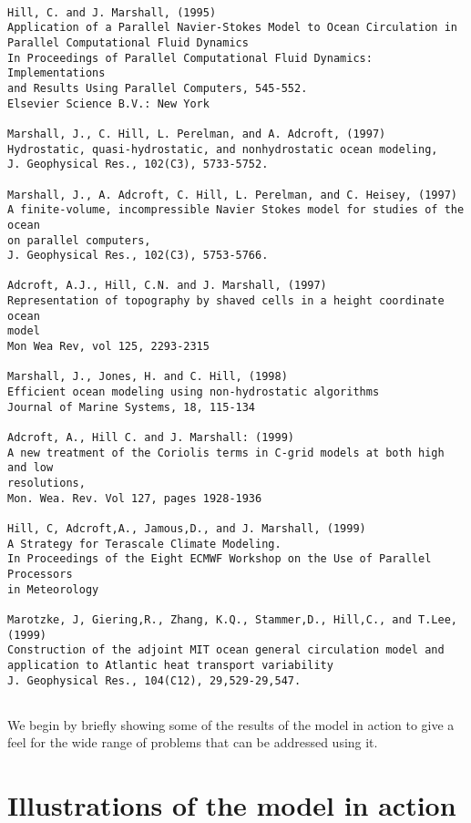 \begin{verbatim}

Hill, C. and J. Marshall, (1995)
Application of a Parallel Navier-Stokes Model to Ocean Circulation in 
Parallel Computational Fluid Dynamics
In Proceedings of Parallel Computational Fluid Dynamics: Implementations 
and Results Using Parallel Computers, 545-552.
Elsevier Science B.V.: New York

Marshall, J., C. Hill, L. Perelman, and A. Adcroft, (1997)
Hydrostatic, quasi-hydrostatic, and nonhydrostatic ocean modeling,
J. Geophysical Res., 102(C3), 5733-5752.

Marshall, J., A. Adcroft, C. Hill, L. Perelman, and C. Heisey, (1997)
A finite-volume, incompressible Navier Stokes model for studies of the ocean
on parallel computers,
J. Geophysical Res., 102(C3), 5753-5766.

Adcroft, A.J., Hill, C.N. and J. Marshall, (1997)
Representation of topography by shaved cells in a height coordinate ocean
model
Mon Wea Rev, vol 125, 2293-2315

Marshall, J., Jones, H. and C. Hill, (1998)
Efficient ocean modeling using non-hydrostatic algorithms
Journal of Marine Systems, 18, 115-134

Adcroft, A., Hill C. and J. Marshall: (1999)
A new treatment of the Coriolis terms in C-grid models at both high and low
resolutions,
Mon. Wea. Rev. Vol 127, pages 1928-1936

Hill, C, Adcroft,A., Jamous,D., and J. Marshall, (1999)
A Strategy for Terascale Climate Modeling.
In Proceedings of the Eight ECMWF Workshop on the Use of Parallel Processors
in Meteorology

Marotzke, J, Giering,R., Zhang, K.Q., Stammer,D., Hill,C., and T.Lee, (1999)
Construction of the adjoint MIT ocean general circulation model and 
application to Atlantic heat transport variability
J. Geophysical Res., 104(C12), 29,529-29,547.


\end{verbatim}

We begin by briefly showing some of the results of the model in action to
give a feel for the wide range of problems that can be addressed using it.


\section{Illustrations of the model in action}

